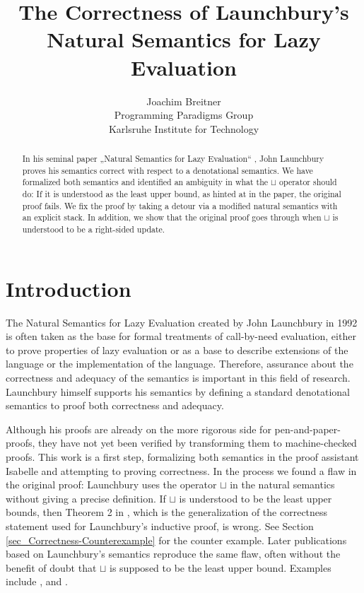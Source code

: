 \documentclass[11pt,a4paper,parskip=half]{scrartcl}
\begin{document}
\title{The Correctness of Launchbury's Natural Semantics for Lazy Evaluation}
\author{Joachim Breitner\\
Programming Paradigms Group\\
Karlsruhe Institute for Technology}
\maketitle

\begin{abstract}
In his seminal paper „Natural Semantics for Lazy Evaluation“ \cite{launchbury},
John Launchbury proves his semantics correct with respect to a denotational
semantics. We have formalized both semantics and identified an ambiguity in
what the $\sqcup$ operator should do: If it is understood as the least upper
bound, as hinted at in the paper, the original proof fails.  We fix the proof
by taking a detour via a modified natural semantics with an explicit stack. In
addition, we show that the original proof goes through when $\sqcup$ is
understood to be a right-sided update.
\end{abstract}

\tableofcontents

\section{Introduction}

The Natural Semantics for Lazy Evaluation \cite{launchbury} created by John Launchbury in 1992 is often taken as the base for formal treatments of call-by-need evaluation, either to prove properties of lazy evaluation or as a base to describe extensions of the language or the implementation of the language. Therefore, assurance about the correctness and adequacy of the semantics is important in this field of research. Launchbury himself supports his semantics by defining a standard denotational semantics to proof both correctness and adequacy.

Although his proofs are already on the more rigorous side for pen-and-paper-proofs, they have not yet been verified by transforming them to machine-checked proofs. This work is a first step, formalizing both semantics in the proof assistant Isabelle and attempting to proving correctness. In the process we found a flaw in the original proof: Launchbury uses the operator $\sqcup$ in the natural semantics without giving a precise definition. If $\sqcup$ is understood to be the least upper bounds, then Theorem 2 in \cite{launchbury}, which is the generalization of the correctness statement used for Launchbury's inductive proof, is wrong. See Section \ref{sec_Correctness-Counterexample} for the counter example. Later publications based on Launchbury’s semantics reproduce the same flaw, often without the benefit of doubt that $\sqcup$ is supposed to be the least upper bound. Examples include \cite{nakata_extended}%
, \cite{mixed} and \cite{distributed}. 
\end{document}
